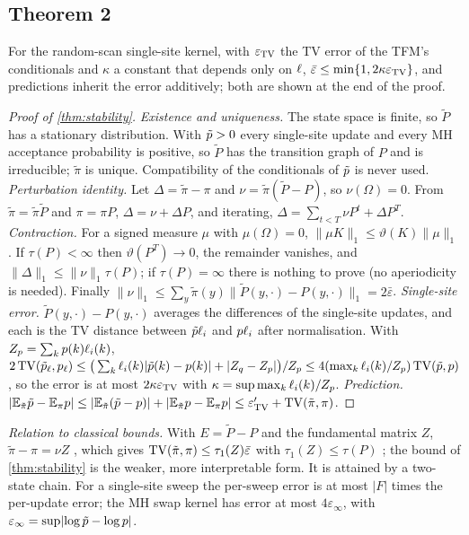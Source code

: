 \subsection{Theorem 2}
For the random-scan single-site kernel, with $\varepsilon_{\mathrm{TV}}$ the TV error of the TFM's conditionals and $\kappa$ a
constant that depends only on $\ell$, $\bar\varepsilon\le\min\{1,2\kappa\varepsilon_{\mathrm{TV}}\}$, and predictions inherit the
error additively; both are shown at the end of the proof.
\begin{proof}[Proof of \cref{thm:stability}]
\emph{Existence and uniqueness.} The state space is finite, so $\tilde P$ has a stationary distribution. With $\tilde p>0$
every single-site update and every MH acceptance probability is positive, so $\tilde P$ has the transition graph of $P$
and is irreducible; $\tilde\pi$ is unique. Compatibility of the conditionals of $\tilde p$ is never used.
\emph{Perturbation identity.} Let $\Delta=\tilde\pi-\pi$ and $\nu=\tilde\pi(\tilde P-P)$, so $\nu(\Omega)=0$. From
$\tilde\pi=\tilde\pi\tilde P$ and $\pi=\pi P$, $\Delta=\nu+\Delta P$, and iterating, $\Delta=\sum_{t<T}\nu P^t+\Delta P^T$.
\emph{Contraction.} For a signed measure $\mu$ with $\mu(\Omega)=0$, $\lVert\mu K\rVert_1\le\vartheta(K)\lVert\mu\rVert_1$.
If $\tau(P)<\infty$ then $\vartheta(P^T)\to0$, the remainder vanishes, and $\lVert\Delta\rVert_1\le\lVert\nu\rVert_1\tau(P)$; if
$\tau(P)=\infty$ there is nothing to prove (no aperiodicity is needed). Finally
$\lVert\nu\rVert_1\le\sum_y\tilde\pi(y)\lVert\tilde P(y,\cdot)-P(y,\cdot)\rVert_1=2\bar\varepsilon$.
\emph{Single-site error.} $\tilde P(y,\cdot)-P(y,\cdot)$ averages the differences of the single-site updates, and each is the
TV distance between $\tilde p\ell_i$ and $p\ell_i$ after normalisation. With $Z_p=\sum_kp(k)\ell_i(k)$,
$2\,\mathrm{TV}(\tilde p_\ell,p_\ell)\le\big(\sum_k\ell_i(k)\lvert\tilde p(k)-p(k)\rvert+\lvert Z_q-Z_p\rvert\big)/Z_p\le4(\max_k\ell_i(k)/Z_p)\,\mathrm{TV}(\tilde p,p)$,
so the error is at most $2\kappa\varepsilon_{\mathrm{TV}}$ with $\kappa=\sup\max_k\ell_i(k)/Z_p$.
\emph{Prediction.} $\lvert\mathbb{E}_{\tilde\pi}\tilde p-\mathbb{E}_\pi p\rvert\le\lvert\mathbb{E}_{\tilde\pi}(\tilde p-p)\rvert+\lvert\mathbb{E}_{\tilde\pi}p-\mathbb{E}_\pi p\rvert\le\varepsilon'_{\mathrm{TV}}+\mathrm{TV}(\tilde\pi,\pi)$.
\end{proof}
\emph{Relation to classical bounds.} With $E=\tilde P-P$ and the fundamental matrix $Z$, $\tilde\pi-\pi=\nu Z$
\citep{schweitzer1968,meyer1980}, which gives $\mathrm{TV}(\tilde\pi,\pi)\le\tau_1(Z)\bar\varepsilon$ with $\tau_1(Z)\le\tau(P)$
\citep{seneta1988,cho2001}; the bound of \cref{thm:stability} is the weaker, more interpretable form. It is attained by a two-state
chain. For a single-site sweep the per-sweep error is at most $\lvert F\rvert$ times the per-update error; the MH swap
kernel has error at most $4\varepsilon_\infty$, with $\varepsilon_\infty=\sup\lvert\log\tilde p-\log p\rvert$.

